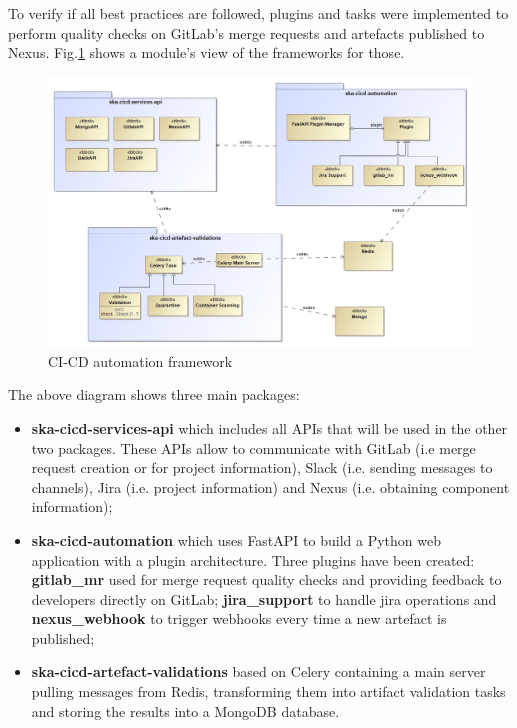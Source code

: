 \documentclass[a4paper,
	       keeplastbox,   %
	       References
	       ]{jacow}
\begin{document}
To verify if all best practices are followed, plugins and tasks were implemented to perform quality checks on GitLab's merge requests and artefacts published to Nexus. Fig.\ref{fig:CICD-automation-quality} shows a module's view of the frameworks for those. 

\begin{figure}[!htb]
    \centering
    \includegraphics*[width=0.8\columnwidth]{CICD-automation-quality}
    \caption{CI-CD automation framework}
    \label{fig:CICD-automation-quality}
 \end{figure}
 
The above diagram shows three main packages:
 
 \begin{itemize}
	\setlength\itemsep{0.1em}
    \item \textbf{ska-cicd-services-api}\cite{ska-cicd-services-api} which includes all APIs that will be used in the other two packages. These APIs allow to communicate with GitLab (i.e merge request creation or for project information), Slack\cite{slack} (i.e. sending messages to channels), Jira \cite{jira} (i.e. project information) and Nexus (i.e. obtaining component information);
    \item \textbf{ska-cicd-automation}\cite{ska-cicd-automation} which uses FastAPI \cite{fastapi} to build a Python web application with a plugin architecture. Three plugins have been created: \textbf{gitlab\_mr} used for merge request quality checks and providing feedback to developers directly on GitLab; \textbf{jira\_support} to handle jira operations and \textbf{nexus\_webhook} to trigger webhooks every time a new artefact is published;
    \item
	    \textbf{ska-cicd-artefact-validations}\cite{ska-cicd-artefact-validations} based on Celery\cite{celery} containing a main server pulling messages from Redis\cite{redis}, transforming them into artifact validation tasks and storing the results into a MongoDB\cite{mongo} database. 
 \end{itemize}
 
\end{document}
